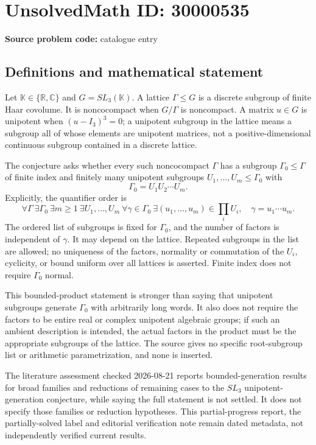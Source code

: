 \documentclass[11pt]{article}
\newcommand{\R}{\mathbb{R}}
\newcommand{\C}{\mathbb{C}}
\begin{document}
\section*{UnsolvedMath ID: 30000535}
\textbf{Source problem code:} catalogue entry
\subsection{Definitions and mathematical statement}
Let \(\mathbb K\in\{\R,\C\}\) and \(G=SL_3(\mathbb K)\). A lattice \(\Gamma\leq G\) is a discrete subgroup of finite Haar covolume. It is noncocompact when \(G/\Gamma\) is noncompact. A matrix \(u\in G\) is unipotent when \((u-I_3)^3=0\); a unipotent subgroup in the lattice means a subgroup all of whose elements are unipotent matrices, not a positive-dimensional continuous subgroup contained in a discrete lattice.

The conjecture asks whether every such noncocompact \(\Gamma\) has a subgroup \(\Gamma_0\leq\Gamma\) of finite index and finitely many unipotent subgroups \(U_1,\ldots,U_m\leq\Gamma_0\) with
\[
 \Gamma_0=U_1U_2\cdots U_m.
\]
Explicitly, the quantifier order is
\[
 \forall\Gamma\ \exists\Gamma_0\ \exists m\geq1\ \exists U_1,\ldots,U_m
 \ \forall\gamma\in\Gamma_0\ \exists(u_1,\ldots,u_m)\in\prod_iU_i,
 \quad\gamma=u_1\cdots u_m.
\]
The ordered list of subgroups is fixed for \(\Gamma_0\), and the number of factors is independent of \(\gamma\). It may depend on the lattice. Repeated subgroups in the list are allowed; no uniqueness of the factors, normality or commutation of the \(U_i\), cyclicity, or bound uniform over all lattices is asserted. Finite index does not require \(\Gamma_0\) normal.

This bounded-product statement is stronger than saying that unipotent subgroups generate \(\Gamma_0\) with arbitrarily long words. It also does not require the factors to be entire real or complex unipotent algebraic groups; if such an ambient description is intended, the actual factors in the product must be the appropriate subgroups of the lattice. The source gives no specific root-subgroup list or arithmetic parametrization, and none is inserted.

The literature assessment checked 2026-08-21 reports bounded-generation results for broad families and reductions of remaining cases to the \(SL_3\) unipotent-generation conjecture, while saying the full statement is not settled. It does not specify those families or reduction hypotheses. This partial-progress report, the partially-solved label and editorial verification note remain dated metadata, not independently verified current results.
\end{document}
